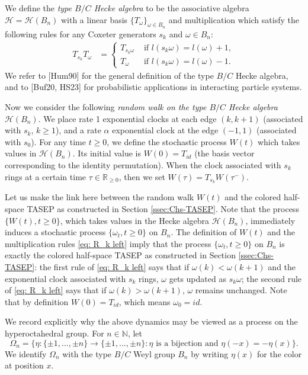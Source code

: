 \documentclass[12pt,a4paper]{amsart}
\theoremstyle{remark}
\numberwithin{equation}{section} \numberwithin{theorem}{section}
\begin{document}
We define the \emph{type $B/C$ Hecke algebra} to be the associative algebra $\mathcal{H}=\mathcal{H}(B_n)$ with a linear basis $\{T_{\omega}\}_{\omega \in B_n}$ and multiplication which satisfy the following rules for any Coxeter generators $s_k$ and $\omega \in B_n$:
\begin{align}
     \label{eq: R_k left} T_{s_k} T_{\omega}&=\begin{cases}T_{s_k\omega}&\text{ if }l(s_k \omega)=l(\omega)+1,
    \\T_{\omega}&\text{ if }l(s_k\omega)=l(\omega)-1.
    \end{cases}
\end{align}
We refer to [Hum90] for the general definition of the type $B/C$ Hecke algebra, and to
[Buf20, HS23] for probabilistic applications in interacting particle systems.

Now we consider the following \emph{random walk on the type $B/C$ Hecke algebra $\mathcal{H}(B_n)$}. We place rate 1 exponential clocks at each edge $(k,k+1)$ (associated with $s_k$, $k \geq 1$), and a rate $\alpha$ exponential clock at the edge $(-1,1)$ (associated with $s_0$). For any time $t \geq 0$, we define the stochastic process $W(t)$ which takes values in $\mathcal{H}(B_n)$. Its initial value is $W(0)=T_{id}$ (the basis vector corresponding to the identity permutation). When the clock associated with $s_k$ rings at a certain time $\tau \in \mathbb{R}_{\geq 0}$, then we set $W(\tau)=T_{s_k}W(\tau^{-})$. 

Let us make the link here between the random walk $W(t)$ and the colored half-space TASEP as constructed in Section \ref{ssec:Chs-TASEP}. Note that the process $\{W(t), t \geq 0\}$, which takes values in the Hecke algebra $\mathcal{H}(B_n)$, immediately induces a stochastic process $\{\omega_{t}, t \geq 0\}$ on $B_n$. The definition of $W(t)$ and the multiplication rules \eqref{eq: R_k left} imply that the process $\{\omega_{t}, t \geq 0\}$ on $B_n$ is exactly the colored half-space TASEP as constructed in Section \ref{ssec:Chs-TASEP}: the first rule of \eqref{eq: R_k left} says that if $\omega(k)<\omega(k+1)$ and the exponential clock associated with $s_k$ rings, $\omega$ gets updated as $s_k \omega$; the second rule of \eqref{eq: R_k left} says that if $\omega(k)>\omega(k+1)$, $\omega$ remains unchanged. Note that by definition $W(0)=T_{id}$, which means $\omega_0=id$.

We record explicitly why the above dynamics may be viewed as a process on the hyperoctahedral group. 
For $n\in\mathbb N$, let
\[
\Omega_n=\{\eta:\{\pm1,\ldots,\pm n\}\to \{\pm1,\ldots,\pm n\}: 
\eta \text{ is a bijection and } \eta(-x)=-\eta(x)\}.
\]
We identify $\Omega_n$ with the type $B/C$ Weyl group $B_n$ by writing $\eta(x)$ for the color at position $x$.
\end{document}
